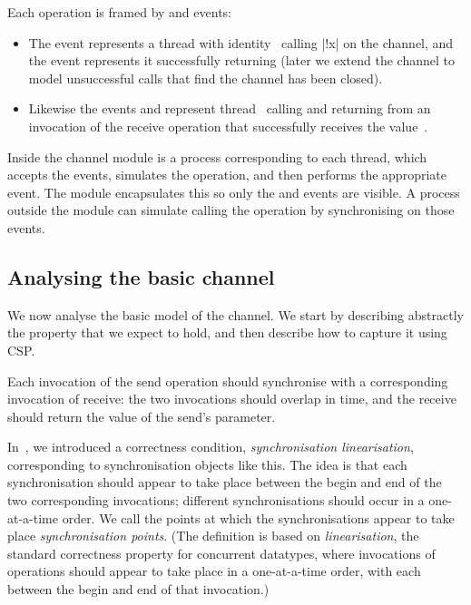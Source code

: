 Each operation is framed by  and  events:
%
\begin{itemize}
\item The event  represents a thread with
  identity~ calling |!x| on the channel, and the event
   represents it successfully returning (later we
  extend the channel to model unsuccessful calls that find the channel has
  been closed).

\item Likewise the events  and
   represent thread~ calling and
  returning from an invocation of the receive operation that successfully
  receives the value~.
\end{itemize}
%
Inside the channel module is a process corresponding to each thread, which
accepts the  events, simulates the operation, and then performs
the appropriate  event.  The module encapsulates this so only the
 and  events are visible.  A process outside the module
can simulate calling the operation by synchronising on those events.


\subsection{Analysing the basic channel}

We now analyse the basic model of the channel.  We start by describing
abstractly the property that we expect to hold, and then describe how to
capture it using CSP.

Each invocation of the send operation should synchronise with a corresponding
invocation of receive: the two invocations should overlap in time, and
the receive should return the value of the send's parameter.  

In~\cite{LL:synchronisation}, we introduced a correctness condition,
\emph{synchronisation linearisation}, corresponding to synchronisation objects
like this.  The idea is that each synchronisation should appear to take place
between the begin and end of the two corresponding invocations; different
synchronisations should occur in a one-at-a-time order.  We call the points at
which the synchronisations appear to take place \emph{synchronisation points}.
(The definition is based on \emph{linearisation}, the standard correctness
property for concurrent datatypes, where invocations of operations should
appear to take place in a one-at-a-time order, with each between the begin and
end of that invocation.)

